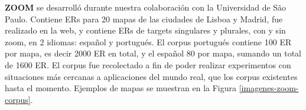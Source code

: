 \label{sec:corpusZOOM}
{\bf ZOOM} \cite{DBLP:conf/acl/AltamiranoFPB15} se desarroll\'o durante nuestra colaboraci\'on con la Universidad de S\~ao Paulo. Contiene ERs para 20 mapas de las ciudades de Lisboa y Madrid, fue realizado en la web, y contiene ERs de targets singulares y plurales, con y sin zoom, en 2 idiomas: espa\~nol y portugu\'es. El corpus portugu\'es contiene 100 ER por mapa, es decir 2000 ER en total, y el espa\~nol 80 por mapa, sumando un total de 1600 ER. El corpus fue recolectado a fin de poder realizar experimentos con situaciones m\'as cercanas a aplicaciones del mundo real, que los corpus existentes hasta el momento. Ejemplos de mapas se muestran en la Figura \ref{imagenes-zoom-corpus}.



